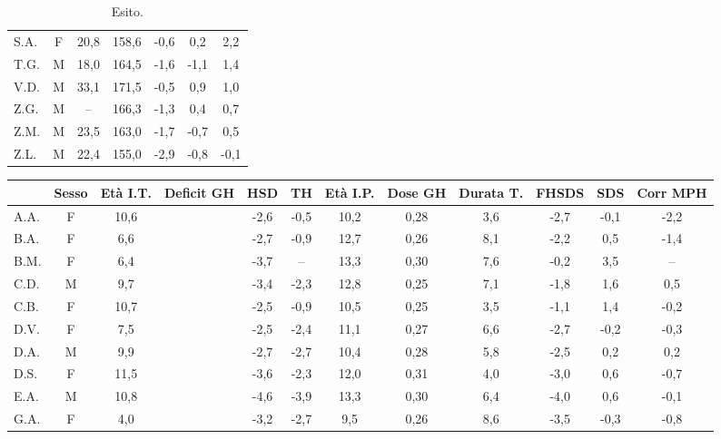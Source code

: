 \begin{table}[!h]
\begin{center}
\begin{tabular}{lcccccc}
S.A.	& F & 20,8 & 158,6 & -0,6  & 0,2   & 2,2     \\
T.G.    & M & 18,0 & 164,5 & -1,6  & -1,1  & 1,4    \\
V.D.	& M & 33,1 & 171,5 & -0,5  & 0,9   & 1,0     \\
Z.G.	& M & --   & 166,3 & -1,3  & 0,4   & 0,7   \\
Z.M.	& M & 23,5 & 163,0 & -1,7  & -0,7  & 0,5     \\
Z.L.	& M & 22,4 & 155,0 & -2,9  & -0,8  & -0,1    \\
\bottomrule
\end{tabular}
\end{center}
\caption{Esito.}
\label{tab:Esito}
\end{table}

\begin{sidewaystable}
\centering
\begin{tabular}{lccccccccccc}
\toprule
 	& Sesso & Età I.T. & Deficit GH & HSD %
 	& TH %
 	& Età I.P.
 	& Dose GH
 	& Durata T.
 	& FHSDS
 	& \Delta SDS
 	& Corr MPH
 	\\
\midrule                                
A.A. & F & 10,6 &  		& -2,6 & -0,5 & 10,2 & 0,28 & 3,6 & -2,7 & -0,1 & -2,2                    \\
B.A. & F & 6,6  & \checkmark 	& -2,7 & -0,9 & 12,7 & 0,26 & 8,1 & -2,2 & 0,5  & -1,4                    \\
B.M. & F & 6,4  & \checkmark 	& -3,7 & --   & 13,3 & 0,30 & 7,6 & -0,2 & 3,5  & --                      \\
C.D. & M & 9,7  & \checkmark 	& -3,4 & -2,3 & 12,8 & 0,25 & 7,1 & -1,8 & 1,6  & 0,5                     \\
C.B. & F & 10,7 &  		& -2,5 & -0,9 & 10,5 & 0,25 & 3,5 & -1,1 & 1,4  & -0,2                           \\
D.V.& F & 7,5  & \checkmark 	& -2,5 & -2,4 & 11,1 & 0,27 & 6,6 & -2,7 & -0,2 & -0,3                    \\
D.A. & M & 9,9  &  		& -2,7 & -2,7 & 10,4 & 0,28 & 5,8 & -2,5 & 0,2     & 0,2                               \\
D.S.& F & 11,5 & \checkmark 	& -3,6 & -2,3 & 12,0 & 0,31 & 4,0 & -3,0 & 0,6  & -0,7                    \\
E.A. & M & 10,8 &  		& -4,6 & -3,9 & 13,3 & 0,30 & 6,4 & -4,0 & 0,6  & -0,1                           \\
G.A. & F & 4,0  &  		& -3,2 & -2,7 & 9,5  & 0,26 & 8,6 & -3,5 & -0,3 & -0,8                               \\

\end{tabular}
\end{sidewaystable}
